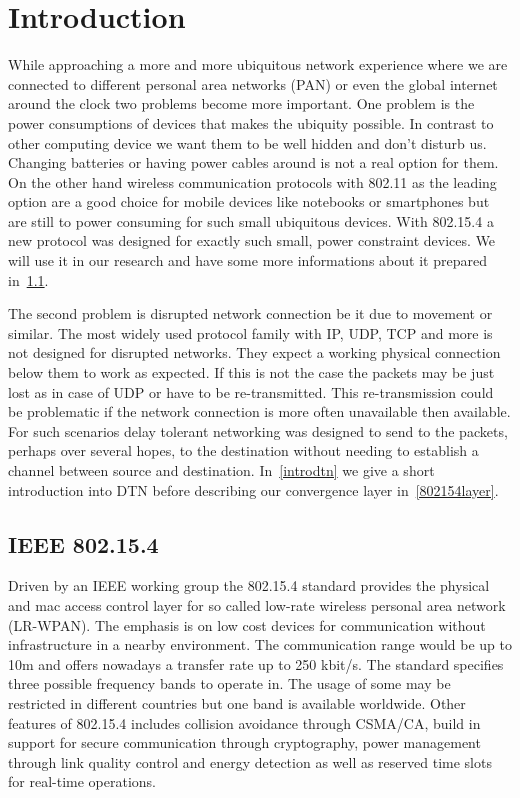 \chapter{Introduction}
While approaching a more and more ubiquitous network experience where we are
connected to different personal area networks (PAN) or even the global internet
around the clock two problems become more important. One problem is the power
consumptions of devices that makes the ubiquity possible. In contrast to other
computing device we want them to be well hidden and don't disturb us. Changing
batteries or having power cables around is not a real option for them. On the
other hand wireless communication protocols with 802.11 as the leading option
are a good choice for mobile devices like notebooks or smartphones but are still
to power consuming for such small ubiquitous devices. With 802.15.4 a new
protocol was designed for exactly such small, power constraint devices. We will
use it in our research and have some more informations about it prepared
in~\ref{intro802154}.

The second problem is disrupted network connection be it due to movement or
similar. The most widely used protocol family with IP, UDP, TCP and more is not
designed for disrupted networks. They expect a working physical connection below
them to work as expected. If this is not the case the packets may be just lost
as in case of UDP or have to be re-transmitted. This re-transmission could be
problematic if the network connection is more often unavailable then available.
For such scenarios delay tolerant networking was designed to send to the
packets, perhaps over several hopes, to the destination without needing to
establish a channel between source and destination. In~\ref{introdtn} we give a
short introduction into DTN before describing our convergence layer
in~\ref{802154layer}.

\section{IEEE 802.15.4}
\label{intro802154}
Driven by an IEEE working group the 802.15.4 standard provides the physical and
mac access control layer for so called low-rate wireless personal area network
(LR-WPAN). The emphasis is on low cost devices for communication without
infrastructure in a nearby environment. The communication range would be up to
10m and offers nowadays a transfer rate up to 250 kbit/s. The standard specifies
three possible frequency bands to operate in. The usage of some may be
restricted in different countries but one band is available worldwide. Other
features of 802.15.4 includes collision avoidance through CSMA/CA, build in
support for secure communication through cryptography, power management through
link quality control and energy detection as well as reserved time slots for
real-time operations.

